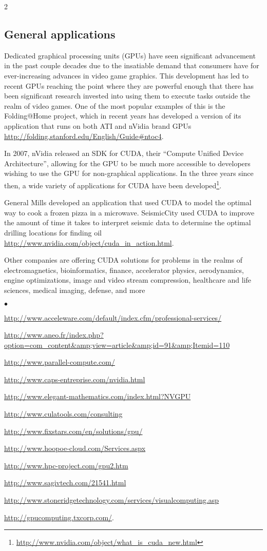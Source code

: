 \documentclass[letterpaper,10pt]{article}
\newcommand{\squishlist}{\begin{list}{$\bullet$}
  {\setlength{\itemsep}{0pt}
    \setlength{\parsep}{3pt}
    \setlength{\topsep}{3pt}
    \setlength{\partopsep}{0pt}
    \setlength{\leftmargin}{1.5em}
    \setlength{\labelwidth}{1em}
    \setlength{\labelsep}{0.5em}}}
\newcommand{\squishend}{\end{list}}
\begin{document}
\begin{multicols}{2}
\subsection{General applications}
  
  Dedicated graphical processing units (GPUs) have seen significant advancement
in the past couple decades due to the insatiable demand that consumers have for
ever-increasing advances in video game graphics. This development has led to
recent GPUs reaching the point where they are powerful enough that there has
been significant research invested into using them to execute tasks outside the
realm of video games. One of the most popular examples of this is the
Folding@Home project, which in recent years has developed a version of its
application that runs on both ATI and nVidia brand GPUs
\url{http://folding.stanford.edu/English/Guide#ntoc4}.
  
  In 2007, nVidia released an SDK for CUDA, their ``Compute Unified Device
Architecture'', allowing for the GPU to be much more accessible to developers
wishing to use the GPU for non-graphical applications. In the three years since
then, a wide variety of applications for CUDA have been developed\footnote{\url{http://www.nvidia.com/object/what\_is\_cuda\_new.html}}.
  
  General Mills developed an application that used CUDA to model the optimal
way to cook a frozen pizza in a microwave. SeismicCity used CUDA to improve the
amount of time it takes to interpret seismic data to determine the optimal
drilling locations for finding oil
\url{http://www.nvidia.com/object/cuda\_in\_action.html}.
  
  Other companies are offering CUDA solutions for problems in the realms of
electromagnetics, bioinformatics, finance, accelerator physics, aerodynamics,
engine optimizations, image and video stream compression, healthcare and life
sciences, medical imaging, defense, and more
\squishlist
\item \url{http://www.acceleware.com/default/index.cfm/professional-services/}
\item \url{http://www.aneo.fr/index.php?option=com\_content&amp;view=article&amp;id=91&amp;Itemid=110}
\item \url{http://www.parallel-compute.com/}
\item \url{http://www.caps-entreprise.com/nvidia.html}
\item \url{http://www.elegant-mathematics.com/index.html?NVGPU}
\item \url{http://www.culatools.com/consulting}
\item \url{http://www.fixstars.com/en/solutions/gpu/}
\item \url{http://www.hoopoe-cloud.com/Services.aspx}
\item \url{http://www.hpc-project.com/gpu2.htm}
\item \url{http://www.sagivtech.com/21541.html}
\item \url{http://www.stoneridgetechnology.com/services/visualcomputing.asp}
\item \url{http://gpucomputing.txcorp.com/}.
\squishend
  

\end{multicols}
\end{document}
